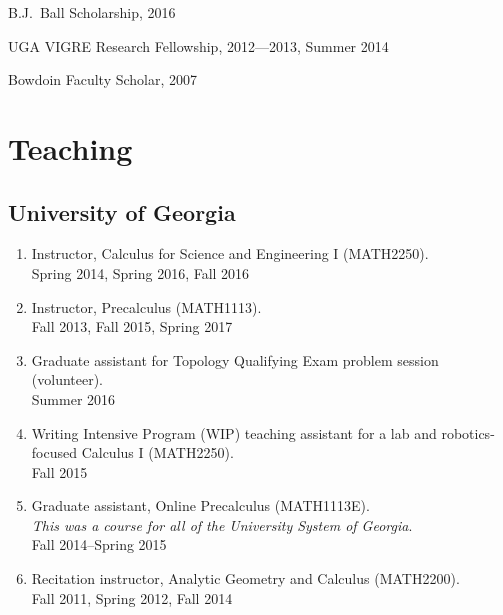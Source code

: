 \documentclass[letterpaper]{article}
\renewenvironment{itemize}{
  \begin{list}{}{
    \setlength{\leftmargin}{1.5em}
  }
}{
  \end{list}
}
\begin{document}
 \begin{itemize}
 \item B.J.\ Ball Scholarship, 2016
 \item UGA VIGRE Research Fellowship, 2012---2013, Summer 2014
 \item Bowdoin Faculty Scholar, 2007
 \end{itemize}

\section*{Teaching}

\subsection*{University of Georgia}

\begin{enumerate}
\item Instructor, Calculus for Science and Engineering I (MATH2250). \\
  Spring 2014, Spring 2016, Fall 2016
\item Instructor, Precalculus (MATH1113). \\
  Fall 2013, Fall 2015, Spring 2017
\item Graduate assistant for Topology Qualifying Exam problem session
  (volunteer). \\
  Summer 2016
\item Writing Intensive Program (WIP) teaching assistant for a lab and
  robotics-focused Calculus I (MATH2250). \\
  Fall 2015
\item Graduate assistant, Online Precalculus (MATH1113E). \\
  \emph{This was a course for all of the University System of Georgia}.\\
  Fall 2014--Spring 2015
\item Recitation instructor, Analytic Geometry and Calculus
  (MATH2200).\\
  Fall 2011, Spring 2012, Fall 2014

\end{enumerate}
\end{document}
